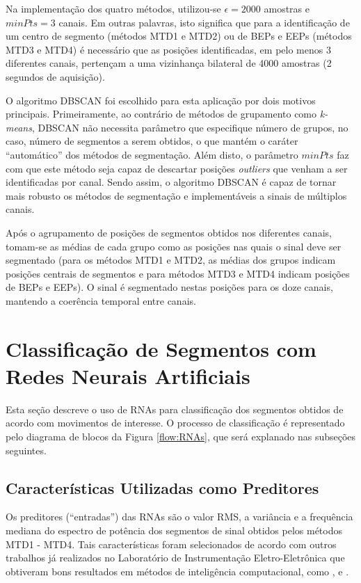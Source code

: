 Na implementação dos quatro métodos, utilizou-se $\epsilon = 2000$ amostras e $minPts = 3$ canais. Em outras palavras, isto significa que para a identificação de um centro de segmento (métodos MTD1 e MTD2) ou de BEPs e EEPs (métodos MTD3 e MTD4) é necessário que as posições identificadas, em pelo menos 3 diferentes canais, pertençam a uma vizinhança bilateral de 4000 amostras (2 segundos de aquisição).

O algoritmo DBSCAN foi escolhido para esta aplicação por dois motivos principais. Primeiramente, ao contrário de métodos de grupamento como \emph{k-means}, DBSCAN não necessita parâmetro que especifique número de grupos, no caso, número de segmentos a serem obtidos, o que mantém o caráter ``automático'' dos métodos de segmentação. Além disto, o parâmetro $minPts$ faz com que este método seja capaz de descartar posições \emph{outliers} que venham a ser identificadas por canal. Sendo assim, o algoritmo DBSCAN é capaz de tornar mais robusto os métodos de segmentação e implementáveis a sinais de múltiplos canais.

Após o agrupamento de posições de segmentos obtidos nos diferentes canais, tomam-se as médias de cada grupo como as posições nas quais o sinal deve ser segmentado (para os métodos MTD1 e MTD2, as médias dos grupos indicam posições centrais de segmentos e para métodos MTD3 e MTD4 indicam posições de BEPs e EEPs). O sinal é segmentado nestas posições para os doze canais, mantendo a coerência temporal entre canais.

		\section{Classificação de Segmentos com Redes Neurais Artificiais}
Esta seção descreve o uso de RNAs para classificação dos segmentos obtidos de acordo com movimentos de interesse. O processo de classificação é representado pelo diagrama de blocos da Figura \ref{flow:RNAs}, que será explanado nas subseções seguintes.



			\subsection{Características Utilizadas como Preditores}
Os preditores (``entradas'') das RNAs são o valor RMS, a variância e a frequência mediana do espectro de potência dos segmentos de sinal obtidos pelos métodos MTD1 - MTD4. Tais características foram selecionados de acordo com outros trabalhos já realizados no Laboratório de Instrumentação Eletro-Eletrônica que obtiveram bons resultados em métodos de inteligência computacional, como ,  e .

